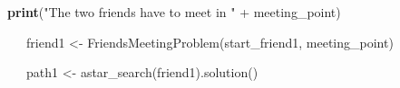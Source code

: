 \documentclass[12pt]{article}
\begin{document}
\begin{adjustwidth}{0.5in}{0.0in}
\begin{justify}
 \tabto{0.75in} \tab {}
\end{justify}\par

\end{adjustwidth}

\begin{adjustwidth}{0.5in}{0.0in}
\begin{justify}
 \tabto{0.75in} \tab {}
\end{justify}\par

\end{adjustwidth}


\vspace{\baselineskip}\begin{adjustwidth}{0.5in}{0.0in}
\begin{justify}
 \tabto{0.75in} {\fontsize{8pt}{9.6pt}\selectfont \textbf{print}("The two friends have to meet in " + meeting\_point)\par}
\end{justify}\par

\end{adjustwidth}

\begin{adjustwidth}{0.5in}{0.0in}
\begin{justify}
{\fontsize{8pt}{9.6pt}\selectfont \ \ \  friend1 <- FriendsMeetingProblem(start\_friend1, meeting\_point)\par}
\end{justify}\par

\end{adjustwidth}

\begin{adjustwidth}{0.5in}{0.0in}
\begin{justify}
{\fontsize{8pt}{9.6pt}\selectfont \ \ \  path1 <- astar\_search(friend1).solution()\par}
\end{justify}\par

\end{adjustwidth}
\end{document}
